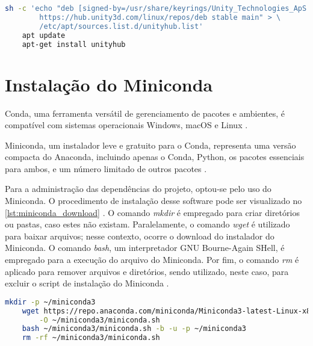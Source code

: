 \begin{lstlisting}[caption={Trecho de código com comando UNIX para adicionar o repositório do Unity \cite{install_the_unity_hub}},label={lst:unity_repositorio},language=Bash,showstringspaces=false]
    sh -c 'echo "deb [signed-by=/usr/share/keyrings/Unity_Technologies_ApS.gpg] \
        https://hub.unity3d.com/linux/repos/deb stable main" > \
        /etc/apt/sources.list.d/unityhub.list'
    apt update
    apt-get install unityhub
\end{lstlisting}

\section{Instalação do Miniconda}
\label{sec:instalacao_miniconda}

Conda, uma ferramenta versátil de gerenciamento de pacotes e ambientes, é compatível com sistemas operacionais Windows, macOS e Linux \cite{conda_documentation}.

Miniconda, um instalador leve e gratuito para o Conda, representa uma versão compacta do Anaconda, incluindo apenas o Conda, Python, os pacotes essenciais para ambos, e um número limitado de outros pacotes \cite{miniconda_documentation}.

Para a administração das dependências do projeto, optou-se pelo uso do Miniconda. O procedimento de instalação desse software pode ser visualizado no \cref{lst:miniconda_download} \cite{miniconda_documentation}. O comando \emph{mkdir} é empregado para criar diretórios ou pastas, caso estes não existam. Paralelamente, o comando \emph{wget} é utilizado para baixar arquivos; nesse contexto, ocorre o download do instalador do Miniconda. O comando \emph{bash}, um interpretador GNU Bourne-Again SHell, é empregado para a execução do arquivo do Miniconda. Por fim, o comando \emph{rm} é aplicado para remover arquivos e diretórios, sendo utilizado, neste caso, para excluir o script de instalação do Miniconda \cite{debian_man_pages}.

\begin{lstlisting}[caption={Trecho de código com comando UNIX para baixar o Miniconda \cite{miniconda_documentation}},label={lst:miniconda_download},language=Bash,showstringspaces=false]
    mkdir -p ~/miniconda3
    wget https://repo.anaconda.com/miniconda/Miniconda3-latest-Linux-x86_64.sh \
        -O ~/miniconda3/miniconda.sh
    bash ~/miniconda3/miniconda.sh -b -u -p ~/miniconda3
    rm -rf ~/miniconda3/miniconda.sh
\end{lstlisting}

